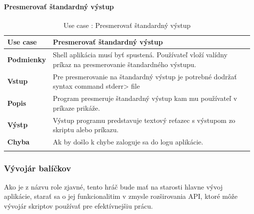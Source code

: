 \paragraph{Presmerovať štandardný výstup}
\begin{center}
	\begin{longtable}{|p{2.5cm}|p{14cm}|}
		
			\hline
			\textbf{Use case} & Presmerovať štandardný výstup \\ 
			\hline
			\textbf{Podmienky} & Shell aplikácia musí byť spustená. Používateľ vloží valídny príkaz na presmerovanie štandardného výstupu. \\ 
			\hline
			\textbf{Vstup} & Pre presmerovanie na štandardný výstup je potrebné dodržať syntax command stderr> file\\
			\hline
			\textbf{Popis} & Program presmeruje štandardný výstup kam mu používateľ v príkaze prikáže.\\ 
			\hline
			\textbf{Výstp} & Výstup programu predstavuje textový reťazec s výstupom zo skriptu alebo príkazu.\\
			\hline
			\textbf{Chyba} & Ak by došlo k chybe zaloguje sa do logu aplikácie.\\
			\hline
		\caption{Use case : Presmerovať štandardný výstup }
		\label{table:1}
		
	\end{longtable}
\end{center}



\subsubsection{Vývojár balíčkov}
\indent Ako je z názvu role zjavné, tento hráč bude mať na starosti hlavne vývoj aplikácie, starať sa o jej funkcionalitim v zmysle rozširovania API, ktoré môže vývojár skriptov používať pre efektívnejšiu prácu.
